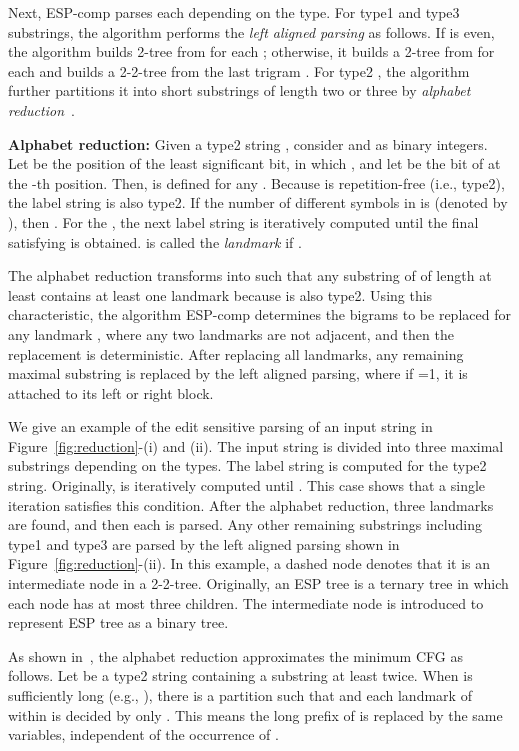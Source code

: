 \documentclass[12pt,a4paper]{scrartcl}
\begin{document}
Next, ESP-comp parses each  depending on the type.
For type1 and type3 substrings, the algorithm performs the \emph{left aligned parsing} as follows. 
If  is even, the algorithm builds 2-tree from  for each ;
otherwise, it builds a 2-tree from  for each  and 
builds a 2-2-tree from the last trigram . 
For type2 , the algorithm further partitions it into short substrings of length two or three by
\emph{alphabet reduction}~\cite{Cormode07}.

{\bf Alphabet reduction:} 
Given a type2 string , consider  and  as binary integers.
Let  be the position of the least significant bit, in which ,
and let  be the bit of  at the -th position.
Then,  is defined for any .
Because  is repetition-free (i.e., type2), the label string  is also type2.
If the number of different symbols in  is  (denoted by ), then .
For the , the next label string is iteratively computed until the final  satisfying
 is obtained.
 is called the \emph{landmark} if . 

The alphabet reduction transforms  into  such that any substring of  of 
length at least  contains at least one landmark because  is also type2.
Using this characteristic, the algorithm ESP-comp determines the bigrams  to be replaced
for any landmark , where any two landmarks are not adjacent, and then the replacement is deterministic.
After replacing all landmarks, any remaining maximal substring  is replaced by the left aligned parsing,
where if  =1, it is attached to its left or right block.

We give an example of the edit sensitive parsing of an input string in Figure~\ref{fig:reduction}-(i) and (ii).
The input string  is divided into three maximal substrings depending on the types.
The label string  is computed for the type2 string.
Originally,  is iteratively computed until .
This case shows that a single iteration satisfies this condition.
After the alphabet reduction, three landmarks  are found, and then each  is parsed.
Any other remaining substrings including type1 and type3 are parsed by the left aligned parsing
shown in Figure~\ref{fig:reduction}-(ii).
In this example, a dashed node denotes that it is an intermediate node in a 2-2-tree.
Originally, an ESP tree is a ternary tree in which each node has at most three children.
The intermediate node is introduced to represent ESP tree as a binary tree.

As shown in~\cite{Cormode07}, the alphabet reduction approximates the
minimum CFG as follows.  Let  be a type2 string containing a
substring  at least twice.  When  is sufficiently long
(e.g., ), there is a partition
 such that  and
each landmark of  within  is decided by only
.  This means the long prefix  of  is
replaced by the same variables, independent of the occurrence of
.
\end{document}
